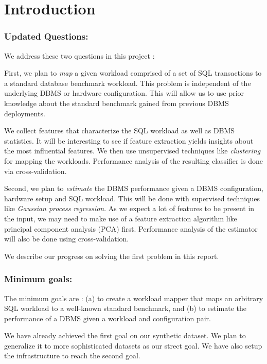 \section{Introduction} \label{sec:intro}

\subsubsection*{Updated Questions:}

We address these two questions in this project :

First, we plan to \textit{map} a given workload comprised of
a set of SQL transactions to a standard database benchmark workload. 
This problem is independent of the underlying DBMS or hardware configuration.
This will allow us to use prior knowledge about the standard 
benchmark gained from previous DBMS deployments. 

We collect features that characterize the SQL workload as well as 
DBMS statistics.
It will be interesting to see if feature extraction yields insights
about the most influential features.
We then use unsupervised techniques like \textit{clustering} 
for mapping the workloads.
Performance analysis of the resulting classifier is done via
cross-validation.

Second, we plan to \textit{estimate} the DBMS performance given a 
DBMS configuration, hardware setup and SQL workload. 
This will be done with supervised techniques like 
\textit{Gaussian process regression}.
As we expect a lot of features to be present in the input, we may
need to make use of a feature extraction algorithm like
principal component analysis (PCA) first.
Performance analysis of the estimator will also be done using 
cross-validation.

We describe our progress on solving the first problem in this report.

\subsubsection*{Minimum goals:}
The minimum goals are : (a) to create a workload mapper that maps an arbitrary
SQL workload to a well-known standard benchmark, and (b) to estimate the
performance of a DBMS given a workload and configuration pair.

We have already achieved the first goal on our synthetic dataset. We plan to
generalize it to more sophisticated datasets as our strect goal. 
We have also setup the infrastructure to reach the second goal.

